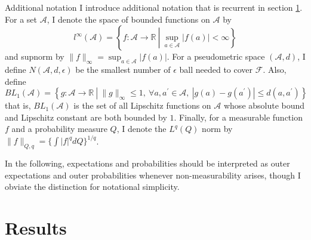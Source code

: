 \documentclass[12pt,oneside,reqno,english]{amsart}
\makeatletter
\renewcommand\subsection{\@startsection{subsection}{2}%
  \z@{-.5\linespacing\@plus-.7\linespacing}{.5\linespacing}%
  {\normalfont\scshape}}
\theoremstyle{definition}
\makeatother
\begin{document}
\subsection{Additional notation}
I introduce additional notation that is recurrent in section \ref{main}. For a set $\mathcal{A}$, I denote the
space of bounded functions on $\mathcal{A}$ by
\[l^{\infty}(\mathcal{A})=\left\{f:\mathcal{A}\rightarrow \mathbb{R}\ \left| \ \sup_{a\in \mathcal{A}}|f(a)|<\infty\right\}\right.\]
and supnorm by $\|f\|_{\infty}=\sup_{a\in \mathcal{A}}|f(a)|$.  
For a pseudometric space $(\mathcal{A},d)$, I define 
$N(\mathcal{A},d,\epsilon)$ be the smallest number of $\epsilon$ ball needed to cover $\mathcal{F}$. 
Also, define
\[BL_{1}(\mathcal{A})=\left\{ g:\mathcal{A}\rightarrow \mathbb{R} \ \left| \ \|g\|_{\infty}\leq 1,\ 
\forall a, a^{\prime}\in \mathcal{A}, \ |g(a)-g(a^{\prime})|\leq d(a,a^{\prime})\right\}\right.\]
that is, $BL_{1}(\mathcal{A})$ is the set of all Lipschitz functions on $\mathcal{A}$ whose absolute bound and Lipschitz
constant are both bounded by $1$.
Finally, for a measurable function $f$ and a probability measure $Q$,  I denote the $L^{q}(Q)$ norm by
$\|f\|_{Q,q}=\{\int |f|^{q}dQ\}^{1/q}$.  

In the following, expectations and probabilities should be interpreted as
outer expectations and outer probabilities \citep{Dudley:99} whenever non-measurability arises, though I obviate the distinction for notational simplicity.

\section{Results}\label{main}
\end{document}
